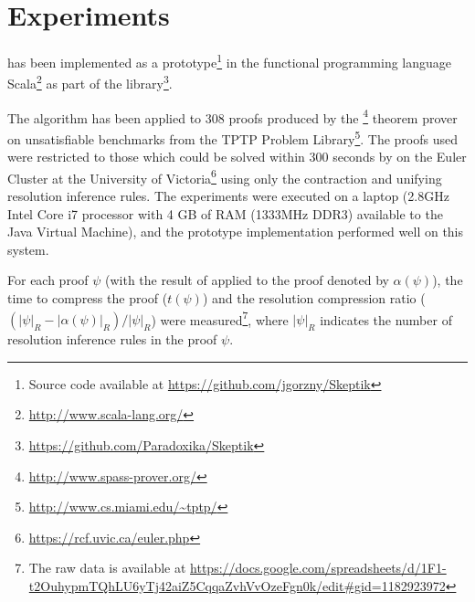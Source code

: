 
\section{Experiments} \label{sec:exp}

{\SFOLowerUnits} has been implemented as a prototype\footnote{Source code available at \url{https://github.com/jgorzny/Skeptik}} in the functional programming language Scala\footnote{\url{http://www.scala-lang.org/}} as part of the \skeptik
 library\footnote{\url{https://github.com/Paradoxika/Skeptik}}. 

The algorithm has been applied to 308 proofs produced by the {\SPASS}\footnote{\url{http://www.spass-prover.org/}} theorem prover on unsatisfiable benchmarks from the TPTP Problem Library\footnote{\url{http://www.cs.miami.edu/~tptp/}}. The proofs used were restricted to those which could be solved within 300 seconds by {\SPASS} on the Euler Cluster at the University of Victoria\footnote{\url{https://rcf.uvic.ca/euler.php}} using only the contraction and unifying resolution inference rules. The experiments were executed on a laptop (2.8GHz Intel Core i7 processor with 4 GB of RAM (1333MHz DDR3) available to the Java Virtual Machine), and the prototype implementation performed well on this system.


For each proof $\psi$ (with the result of {\SFOLowerUnits} applied to the proof denoted by $\alpha(\psi)$), the time to compress the proof ($t(\psi)$) and the resolution compression ratio  ($(|\psi|_R-|\alpha(\psi)|_R)/|\psi|_R$) were measured\footnote{The raw data is available at \url{https://docs.google.com/spreadsheets/d/1F1-t2OuhypmTQhLU6yTj42aiZ5CqqaZvhVvOzeFgn0k/edit\#gid=1182923972}}, where $|\psi|_R$ indicates the number of resolution inference rules in the proof $\psi$.

